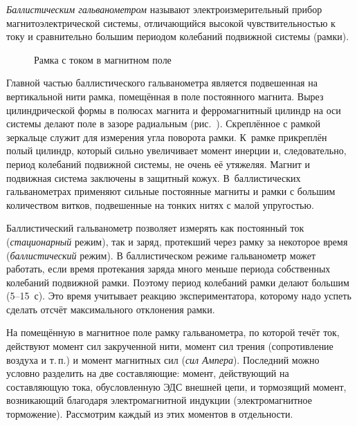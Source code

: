 \label{lab:galvanometr}



\emph{Баллистическим гальванометром} называют электроизмерительный прибор
магнитоэлектрической системы, отличающийся высокой чувствительностью к
току и сравнительно большим периодом колебаний подвижной системы
(рамки).

\begin{wrapfigure}[16]{o}{0.37\textwidth}
    \centering
    \vspace*{-\baselineskip}
    \caption{Рамка с током в магнитном поле}
\end{wrapfigure}

Главной частью баллистического гальванометра является подвешенная на
вертикальной нити рамка, помещённая в поле постоянного магнита. Вырез
цилиндрической формы в полюсах магнита и ферромагнитный цилиндр на оси
системы делают поле в зазоре радиальным (рис.~). 
Скреплённое с рамкой
зеркальце служит для измерения угла поворота рамки. К~рамке прикреплён
полый цилиндр, который сильно увеличивает момент инерции и,
следовательно, период колебаний подвижной системы, не очень её утяжеляя.
Магнит и подвижная система заключены в защитный кожух. В~баллистических
гальванометрах применяют сильные постоянные магниты и рамки с большим
количеством витков, подвешенные на тонких нитях с малой упругостью.

Баллистический гальванометр позволяет измерять как постоянный ток
(\emph{стационарный} режим), так и заряд, протекший через рамку за некоторое
время (\emph{баллистический} режим). В баллистическом режиме гальванометр может
работать, если время протекания заряда много меньше периода собственных
колебаний подвижной рамки. Поэтому период колебаний рамки делают большим
(5--15~с). Это время учитывает реакцию экспериментатора, которому надо
успеть сделать отсчёт максимального отклонения рамки.

На помещённую в магнитное поле рамку гальванометра, по которой течёт ток, 
действуют момент сил закрученной нити, момент сил трения (сопротивление
воздуха и т.\,п.) и момент магнитных сил (\emph{сил Ампера}).
Последний можно условно разделить на две составляющие: момент, действующий
на составляющую тока, обусловленную ЭДС внешней цепи, и тормозящий момент,
возникающий благодаря электромагнитной индукции (электромагнитное торможение). 
Рассмотрим каждый из этих моментов в отдельности.


